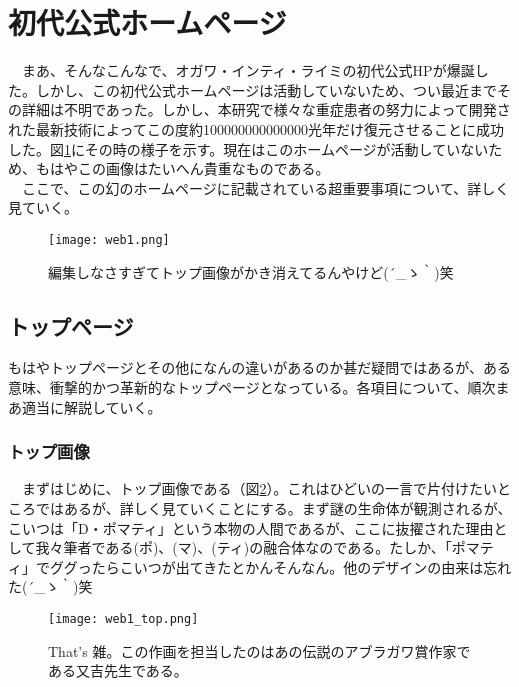 \section{初代公式ホームページ}
　まあ、そんなこんなで、オガワ・インティ・ライミの初代公式HPが爆誕した。しかし、この初代公式ホームページは活動していないため、つい最近までその詳細は不明であった。しかし、本研究で様々な重症患者の努力によって開発された最新技術によってこの度約100000000000000光年だけ復元させることに成功した。図\ref{web1}にその時の様子を示す。現在はこのホームページが活動していないため、もはやこの画像はたいへん貴重なものである。\\
　ここで、この幻のホームページに記載されている超重要事項について、詳しく見ていく。\\

\begin{figure}[H]
  \centering
  \texttt{[image: web1.png]}
  \caption{編集しなさすぎてトップ画像がかき消えてるんやけど\sf (´\_ゝ｀)笑}
\label{web1}
\end{figure}


\subsection{トップページ}
もはやトップページとその他になんの違いがあるのか甚だ疑問ではあるが、ある意味、衝撃的かつ革新的なトップページとなっている。各項目について、順次まあ適当に解説していく。\\
\subsubsection{トップ画像}
　まずはじめに、トップ画像である（図\ref{web1_top}）。これはひどいの一言で片付けたいところではあるが、詳しく見ていくことにする。まず謎の生命体が観測されるが、こいつは「D・ポマティ」という本物の人間であるが、ここに抜擢された理由として我々筆者である(ポ)、(マ)、(ティ)の融合体なのである。たしか、「ポマティ」でググったらこいつが出てきたとかんそんなん。他のデザインの由来は忘れた\sf (´\_ゝ｀)笑\\
\begin{figure}[H]
  \centering
  \texttt{[image: web1\_top.png]}
  \caption{That's 雑。この作画を担当したのはあの伝説のアブラガワ賞作家である又吉先生である。}
\label{web1_top}
\end{figure}

